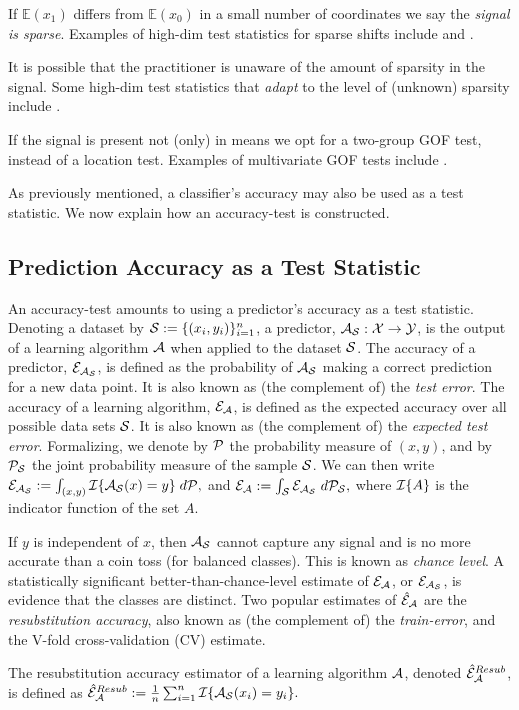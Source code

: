 \documentclass[]{bio}
\begin{document}
If $\mathbb{E}(x_1)$ differs from $\mathbb{E}(x_0)$ in a small number of coordinates we say the \emph{signal is sparse}.
Examples of high-dim test statistics for sparse shifts include \cite{cai_two-sample_2013} and \cite{chang2014simulation}.

It is possible that the practitioner is unaware of the amount of sparsity in the signal. 
Some high-dim test statistics that \emph{adapt} to the level of (unknown) sparsity include \cite{simes1986improved,donoho2004higher,zhong2013tests,shen2015adaptive,moscovich2016exact}.

If the signal is present not (only) in means we opt for a two-group GOF test, instead of a location test. 
Examples of multivariate GOF tests include \cite{bickel1969distribution,friedman1979multivariate,hall2002permutation,szekely2004testing,Biau2005,Rosenbaum2005,eric2008testing,perez2009estimation,vayatis_auc_2009,gretton_kernel_2012-1}.

As previously mentioned, a classifier's accuracy may also be used as a test statistic. 
We now explain how an accuracy-test is constructed. 


\subsection{Prediction Accuracy as a Test Statistic}
An accuracy-test amounts to using a predictor's accuracy as a test statistic.  
Denoting a dataset by $\mathcal{S}:=\{(x_i,y_i)\}_{i=1}^n$, a predictor, $\mathcal{A}_{\mathcal{S}}:\mathcal{X} \to \mathcal{Y}$, is the output of a learning algorithm $\mathcal{A}$ when applied to the dataset $\mathcal{S}$. 
The accuracy of a predictor, $\mathcal{E}_{\mathcal{A}_{\mathcal{S}}}$, is defined as the probability of $\mathcal{A}_{\mathcal{S}}$ making a correct prediction for a new data point. 
It is also known as (the complement of) the \emph{test error}.
The accuracy of a learning algorithm, $\mathcal{E}_{\mathcal{A}}$, is defined as the expected accuracy over all possible data sets $\mathcal{S}$. 
It is also known as (the complement of) the \emph{expected test error}.
Formalizing, we denote by $\mathcal{P}$ the probability measure of $(x, y)$, and by $\mathcal{P}_{\mathcal{S}}$ the joint probability measure of the sample $\mathcal{S}$. 
We can then write $\mathcal{E}_{\mathcal{A}_{\mathcal{S}}}:=\int_{(x,y)} \mathcal{I}{\{ \mathcal{A}_{\mathcal{S}}(x)=y \}} \; d\mathcal{P},$
and
$\mathcal{E}_{\mathcal{A}}:=\int_{\mathcal{S}} \mathcal{E}_{\mathcal{A}_{\mathcal{S}}} \; d\mathcal{P}_{\mathcal{S}},$
where $\mathcal{I}{\{ A \}}$ is the indicator function of the set $A$. 

If $y$ is independent of $x$, then $\mathcal{A}_{\mathcal{S}}$ cannot capture any signal and is no more accurate than a coin toss (for balanced classes). 
This is known as \emph{chance level}.
A statistically significant better-than-chance-level estimate of $\mathcal{E}_{\mathcal{A}}$, or $\mathcal{E}_{\mathcal{A}_{\mathcal{S}}}$, is evidence that the classes are distinct. 
Two popular estimates of $\hat{\mathcal{E}}_{\mathcal{A}}$ are the \emph{resubstitution accuracy}, also known as (the complement of) the \emph{train-error}, and the V-fold cross-validation (CV) estimate.
\begin{definition}
	\label{def:resubstitution}
	The resubstitution accuracy estimator of a learning algorithm $\mathcal{A}$, denoted $\hat{\mathcal{E}}_{\mathcal{A}}^{Resub}$,  is defined as
	$\hat{\mathcal{E}}_{\mathcal{A}}^{Resub} := \frac 1n \sum_{i=1}^{n} \mathcal{I}{\{ \mathcal{A}_{\mathcal{S}}(x_i)=y_i \}}.$
\end{definition}
\end{document}
